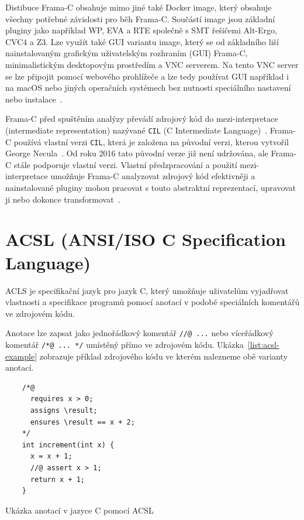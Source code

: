 Distibuce Frama\mbox{-}C obsahuje mimo jiné také Docker image,
který obsahuje všechny potřebné závislosti pro běh Frama\mbox{-}C\@.
Součástí image jsou základní pluginy jako například WP, EVA a RTE
společně s SMT řešičemi Alt-Ergo, CVC4 a Z3.
Lze využít také GUI variantu image, který se od základního liší
nainstalovaným grafickým uživatelským rozhraním (GUI) Frama\mbox{-}C,
minimalistickým desktopovým prostředím a VNC serverem.
Na tento VNC server se lze připojit pomocí webového prohlížeče
a lze tedy používat GUI například i na macOS nebo jiných operačních systémech
bez nutnosti speciálního nastavení nebo instalace~\cite{FCDockerGUIMaroneze2021}.


Frama\mbox{-}C před spuštěním analýzy převádí zdrojový kód do mezi-interpretace (intermediate representation)
nazývané \texttt{CIL} (C Intermediate Language)~\cite{BlanchardACSL2024}.
Frama\mbox{-}C používá vlastní verzi \texttt{CIL}, která je založena na původní verzi, kterou vytvořil George Necula~\cite{Necula2002CIL}.
Od roku 2016 tato původní verze již není udržována, ale Frama\mbox{-}C stále podporuje vlastní verzi.
Vlastní předzpracování a použití mezi-interpretace umožňuje Frama\mbox{-}C
analyzovat zdrojový kód efektivněji a nainstalované pluginy mohou pracovat
s touto abstraktní reprezentací, upravovat ji nebo dokonce transformovat~\cite{FCKernelMaroneze2024}.


\section{ACSL (ANSI/ISO C Specification Language)}
\label{sec:acsl}

ACLS je specifikační jazyk pro jazyk C, který umožňuje uživatelům
vyjadřovat vlastnosti a specifikace programů pomocí anotací v podobě speciálních komentářů ve zdrojovém kódu.

Anotace lze zapsat jako jednořádkový komentář \texttt{//@ ...} nebo víceřádkový komentář \texttt{/*@ ... */} umístěný přímo ve zdrojovém kódu.
Ukázka~\ref{list:acsl-example} zobrazuje příklad zdrojového kódu ve kterém nalezneme obě varianty anotací.

\begin{listing}[H]
    \begin{verbatim}
    /*@
      requires x > 0;
      assigns \result;
      ensures \result == x + 2;
    */
    int increment(int x) {
      x = x + 1;
      //@ assert x > 1;
      return x + 1;
    }
    \end{verbatim}
    \caption{Ukázka anotací v jazyce C pomocí ACSL}
    \label{list:acsl-example}
\end{listing}

